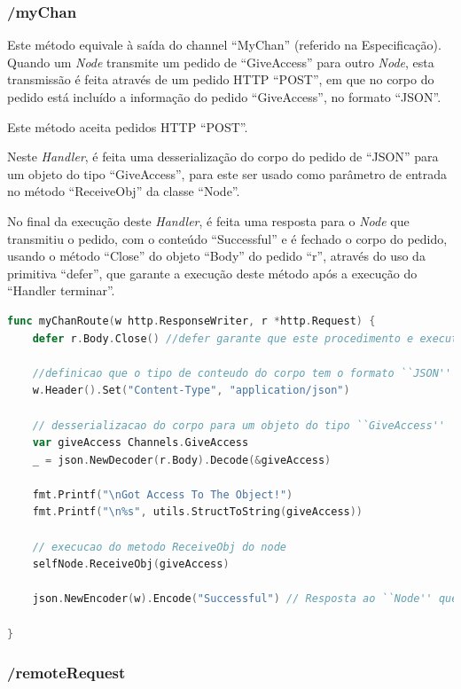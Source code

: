 \subsubsection*{/myChan}
Este método equivale à saída do channel ``MyChan'' (referido na Especificação).
Quando um \emph{Node} transmite um pedido de ``GiveAccess'' para outro \emph{Node},
esta transmissão é feita através de um pedido \acs{HTTP} ``POST'', em que no corpo 
do pedido está incluído a informação do pedido ``GiveAccess'', no formato ``JSON''.

Este método aceita pedidos \acs{HTTP} ``POST''.

Neste \emph{Handler}, é feita uma desserialização do corpo do pedido de ``JSON'' para um objeto
do tipo ``GiveAccess'', para este ser usado como parâmetro de entrada no método ``ReceiveObj''
da classe ``Node''.

No final da execução deste \emph{Handler}, é feita uma resposta para o \emph{Node} que transmitiu o pedido, com o conteúdo ``Successful''
e é fechado o corpo do pedido, usando o método ``Close'' do objeto ``Body'' do pedido ``r'',
através do uso da primitiva ``defer'', que garante a execução deste método após a execução do ``Handler terminar''.

\begin{lstlisting}[caption={\emph{Handler} ``myChanRoute'' do método ``/myChan''},language=Go]
func myChanRoute(w http.ResponseWriter, r *http.Request) {
	defer r.Body.Close() //defer garante que este procedimento e executado quando a execucao deste ``Handler'' termina

	//definicao que o tipo de conteudo do corpo tem o formato ``JSON''
	w.Header().Set("Content-Type", "application/json")

	// desserializacao do corpo para um objeto do tipo ``GiveAccess''
	var giveAccess Channels.GiveAccess
	_ = json.NewDecoder(r.Body).Decode(&giveAccess)

	fmt.Printf("\nGot Access To The Object!")
	fmt.Printf("\n%s", utils.StructToString(giveAccess))

	// execucao do metodo ReceiveObj do node
	selfNode.ReceiveObj(giveAccess)

	json.NewEncoder(w).Encode("Successful") // Resposta ao ``Node'' que realizou o pedido \acs{HTTP}

}

\end{lstlisting}

\subsubsection*{/remoteRequest}

